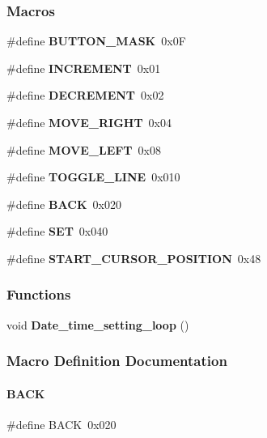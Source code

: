 \subsubsection*{Macros}
\begin{DoxyCompactItemize}
\item 
\#define \textbf{ B\+U\+T\+T\+O\+N\+\_\+\+M\+A\+SK}~0x0F
\item 
\#define \textbf{ I\+N\+C\+R\+E\+M\+E\+NT}~0x01
\item 
\#define \textbf{ D\+E\+C\+R\+E\+M\+E\+NT}~0x02
\item 
\#define \textbf{ M\+O\+V\+E\+\_\+\+R\+I\+G\+HT}~0x04
\item 
\#define \textbf{ M\+O\+V\+E\+\_\+\+L\+E\+FT}~0x08
\item 
\#define \textbf{ T\+O\+G\+G\+L\+E\+\_\+\+L\+I\+NE}~0x010
\item 
\#define \textbf{ B\+A\+CK}~0x020
\item 
\#define \textbf{ S\+ET}~0x040
\item 
\#define \textbf{ S\+T\+A\+R\+T\+\_\+\+C\+U\+R\+S\+O\+R\+\_\+\+P\+O\+S\+I\+T\+I\+ON}~0x48
\end{DoxyCompactItemize}
\subsubsection*{Functions}
\begin{DoxyCompactItemize}
\item 
void \textbf{ Date\+\_\+time\+\_\+setting\+\_\+loop} ()
\end{DoxyCompactItemize}


\subsubsection{Macro Definition Documentation}
\mbox{\label{a00029_ab303ee384877c80cb8855bf0113faf88}} 
\paragraph{B\+A\+CK}
{\footnotesize\ttfamily \#define B\+A\+CK~0x020}

\mbox{\label{a00029_afe20026ae95d143f6354cd1bb5b7a0a9}} 
